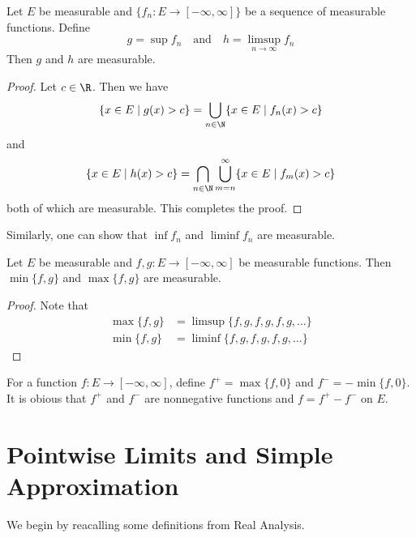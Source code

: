 \begin{theorem}
    Let $E$ be measurable and $\{f_n: E\to[-\infty,\infty]\}$ be a sequence of measurable functions. Define 
    \begin{equation*}
        g = \sup f_n\quad\text{and}\quad h = \limsup_{n\to\infty} f_n
    \end{equation*}
    Then $g$ and $h$ are measurable.
\end{theorem}
\begin{proof}
    Let $c\in\R$. Then we have 
    \begin{equation*}
        \{x\in E\mid g(x) > c\} = \bigcup_{n\in\N}\{x\in E\mid f_n(x)>c\}
    \end{equation*}
    and 
    \begin{equation*}
        \{x\in E\mid h(x) > c\} = \bigcap_{n\in\N}\bigcup_{m = n}^\infty\{x\in E\mid f_m(x) > c\}
    \end{equation*}
    both of which are measurable. This completes the proof.
\end{proof}

Similarly, one can show that $\inf f_n$ and $\liminf f_n$ are measurable.

\begin{corollary}
    Let $E$ be measurable and $f,g: E\to[-\infty,\infty]$ be measurable functions. Then $\min\{f,g\}$ and $\max\{f,g\}$ are measurable.
\end{corollary}
\begin{proof}
    Note that 
    \begin{align*}
        \max\{f,g\} &= \limsup\{f,g,f,g,f,g,\ldots\}\\
        \min\{f,g\} &= \liminf\{f,g,f,g,f,g,\ldots\}
    \end{align*}
\end{proof}

For a function $f: E\to[-\infty,\infty]$, define $f^+ = \max\{f, 0\}$ and $f^- = -\min\{f, 0\}$. It is obious that $f^+$ and $f^-$ are nonnegative functions and $f = f^+ - f^-$ on $E$.


\section{Pointwise Limits and Simple Approximation}

We begin by reacalling some definitions from Real Analysis.

